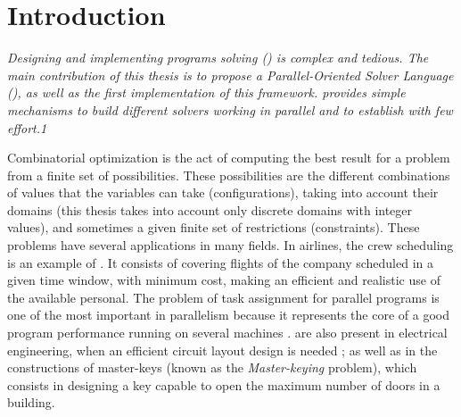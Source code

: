 \chapter{Introduction}
\label{chap:Intro}
\textit{Designing and implementing programs solving \CSPs{} (\csp) is complex and tedious. The main contribution of this thesis is to propose a Parallel-Oriented Solver Language (\posl), as well as the first implementation of this framework. \posl{} provides simple mechanisms to build different solvers working in parallel and to establish \commstrs{} with few effort.1}
\vfill
\minitoc
\newpage

Combinatorial optimization is the act of computing the best result for a problem from a finite set of possibilities. These possibilities are the different combinations of values that the variables can take (configurations), taking into account their domains (this thesis takes into account only discrete domains with integer values), and sometimes a given finite set of restrictions (constraints). These problems have several applications in many fields. In airlines, the crew scheduling is an example of \COP. It consists of covering flights of the company scheduled in a given time window, with minimum cost, making an efficient and realistic use of the available personal. The problem of task assignment for parallel programs is one of the most important in parallelism because it represents the core of a good program performance running on several machines \cite{Paschos2013}. %
\COPs{} are also present in electrical engineering, when an efficient circuit layout design is needed \cite{Barahona1988}; as well as in the constructions of master-keys (known as the \textit{Master-keying} problem), which consists in designing a key capable to open the maximum number of doors in a building\cite{Espelage2000}.

